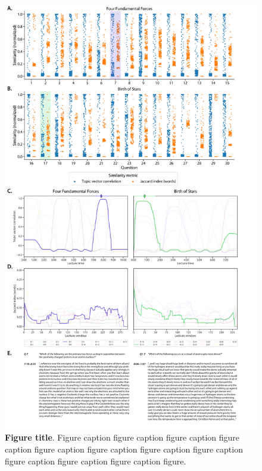\documentclass[10pt]{article}
\begin{document}
\begin{figure}[tp]
    \centering
    \includegraphics[width=\textwidth]{figs/word-overlap-comparison}

    \caption{\textbf{Figure title}. Figure caption figure caption figure caption figure caption figure caption figure caption figure caption figure caption figure caption figure caption figure caption figure.}

    \label{fig:compare-wordcount}
\end{figure}
\end{document}
